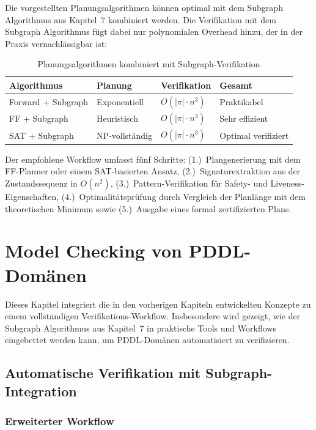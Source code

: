 ﻿\documentclass[a4paper,12pt]{article}
\theoremstyle{definition}
\begin{document}
Die vorgestellten Planungsalgorithmen können optimal mit dem Subgraph Algorithmus aus Kapitel~7 kombiniert werden. Die Verifikation mit dem Subgraph Algorithmus fügt dabei nur polynomialen Overhead hinzu, der in der Praxis vernachlässigbar ist:

\begin{table}[h]
	\centering
	\caption{Planungsalgorithmen kombiniert mit Subgraph-Verifikation}
	\label{tab:planner_with_verification}
	\begin{tabular}{llll}
		\toprule
		Algorithmus & Planung & Verifikation & Gesamt \\
		\midrule
		Forward + Subgraph & Exponentiell & $O(|\pi| \cdot n^3)$ & Praktikabel \\
		FF + Subgraph & Heuristisch & $O(|\pi| \cdot n^3)$ & Sehr effizient \\
		SAT + Subgraph & NP-vollständig & $O(|\pi| \cdot n^3)$ & Optimal verifiziert \\
		\bottomrule
	\end{tabular}
\end{table}

Der empfohlene Workflow umfasst fünf Schritte: (1.)~Plangenerierung mit dem FF-Planner oder einem SAT-basierten Ansatz, (2.)~Signaturextraktion aus der Zustandssequenz in $O(n^2)$, (3.)~Pattern-Verifikation für Safety- und Liveness-Eigenschaften, (4.)~Optimalitätsprüfung durch Vergleich der Planlänge mit dem theoretischen Minimum sowie (5.)~Ausgabe eines formal zertifizierten Plans.

\section{Model Checking von PDDL-Domänen}

Dieses Kapitel integriert die in den vorherigen Kapiteln entwickelten Konzepte zu einem vollständigen Verifikations-Workflow. Insbesondere wird gezeigt, wie der Subgraph Algorithmus aus Kapitel~7 in praktische Tools und Workflows eingebettet werden kann, um PDDL-Domänen automatisiert zu verifizieren.

\subsection{Automatische Verifikation mit Subgraph-Integration}

\subsubsection{Erweiterter Workflow}
\end{document}
